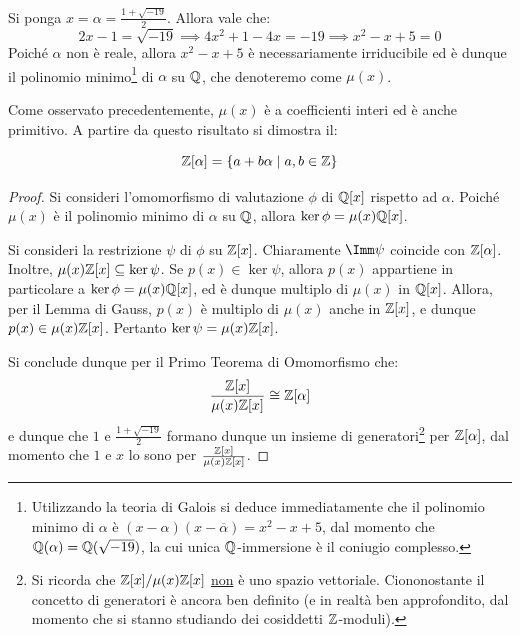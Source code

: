 \documentclass[11pt]{scrartcl}
\begin{document}
	\begin{remark}
		Si ponga $x = \alpha = \frac{1 + \sqrt{-19}}{2}$. Allora vale che:
		\[ 2x - 1 = \sqrt{-19} \implies 4x^2 + 1 - 4x = -19 \implies x^2 - x + 5 = 0 \]
		Poiché $\alpha$ non è reale, allora $x^2 - x + 5$ è necessariamente irriducibile ed è dunque il polinomio minimo\footnote{
			Utilizzando la teoria di Galois si deduce immediatamente che il
			polinomio minimo di $\alpha$ è $(x-\alpha)(x-\overline{\alpha})  = x^2 - x + 5$,
			dal momento che $\mathbb Q(\alpha) = \mathbb Q(\sqrt{-19})$, la cui unica $\mathbb Q$-immersione
			è il coniugio complesso.
		} di $\alpha$ su $\mathbb Q$, che denoteremo come
		$\mu(x)$. \medskip
	\end{remark}
	
	Come osservato precedentemente, $\mu(x)$ è a coefficienti interi ed
	è anche primitivo. A partire da questo risultato si dimostra il:

	\begin{lemma}
		\label{lemma:z_alpha_insieme}
		\[
		\mathbb Z[\alpha] = 
		\{a + b \alpha \mid a, b \in \mathbb Z\}
		\]
	\end{lemma}
	
	\begin{proof}
		Si consideri l'omomorfismo di valutazione $\phi$ di $\mathbb Q[x]$ rispetto
		ad $\alpha$. Poiché $\mu(x)$ è il polinomio minimo di $\alpha$ su $\mathbb Q$,
		allora $\ker \phi = \mu(x) \mathbb Q[x]$. \medskip
		
		
		Si consideri la restrizione $\psi$ di
		$\phi$ su $\mathbb Z[x]$. Chiaramente $\Imm \psi$ coincide con $\mathbb Z[\alpha]$.
		Inoltre, $\mu(x) \mathbb Z[x] \subseteq \ker \psi$. Se $p(x) \in \ker \psi$,
		allora $p(x)$ appartiene in particolare a $\ker \phi = \mu(x) \mathbb Q[x]$,
		ed è dunque multiplo di $\mu(x)$ in $\mathbb Q[x]$. Allora, per il Lemma
		di Gauss, $p(x)$ è multiplo di $\mu(x)$ anche in $\mathbb Z[x]$, e
		dunque $p(x) \in \mu(x) \mathbb Z[x]$. Pertanto $\ker \psi = \mu(x) \mathbb Z[x]$. \medskip


		Si conclude dunque per il Primo Teorema di Omomorfismo che:
		\[ \frac{\mathbb Z[x]}{\mu(x)\mathbb Z[x]} \cong \mathbb Z[\alpha]  \]
		e dunque che $1$ e $\frac{1 + \sqrt{-19}}{2}$ formano dunque
		un insieme di generatori\footnote{
			Si ricorda che $\mathbb Z[x]/\mu(x)\mathbb Z[x]$ \underline{non} è
			uno spazio vettoriale. Ciononostante il concetto di generatori
			è ancora ben definito (e in realtà ben approfondito, dal momento
			che si stanno studiando dei cosiddetti $\mathbb Z$-moduli).
		} per $\mathbb Z[\alpha]$, dal momento che
		$1$ e $x$ lo sono per $\frac{\mathbb Z[x]}{\mu(x)\mathbb Z[x]}$.
	\end{proof}
	
\end{document}
